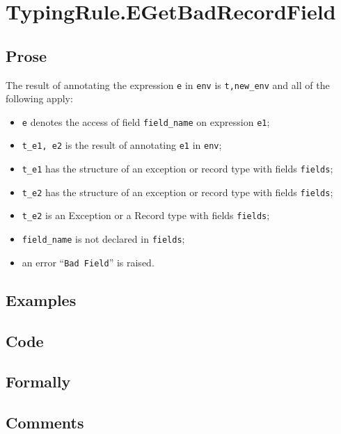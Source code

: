 \documentclass{book}
\begin{document}
\section{TypingRule.EGetBadRecordField \label{sec:TypingRule.EGetBadRecordField}}

  \subsection{Prose}
  The result of annotating the expression \texttt{e} in \texttt{env} is
\texttt{t,new\_env} and all of the following apply:
  \begin{itemize}
  \item \texttt{e} denotes the access of field \texttt{field\_name} on expression \texttt{e1};
  \item \texttt{t\_e1, e2} is the result of annotating \texttt{e1} in \texttt{env};
  \item \texttt{t\_e1} has the structure of an exception or record type with fields \texttt{fields};
  \item \texttt{t\_e2} has the structure of an exception or record type with fields \texttt{fields};
  \item \texttt{t\_e2} is an Exception or a Record type with fields \texttt{fields};
  \item \texttt{field\_name} is not declared in \texttt{fields};
  \item an error ``\texttt{Bad Field}'' is raised.
  \end{itemize}

  \subsection{Examples}

  \subsection{Code}

  \subsection{Formally}

  \subsection{Comments}
\end{document}
